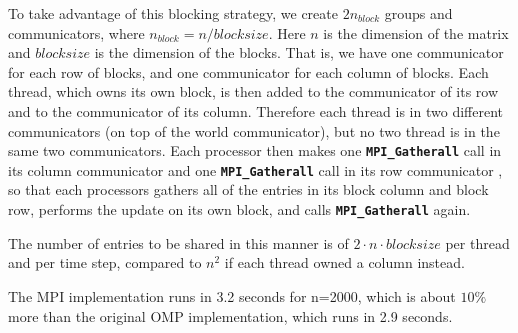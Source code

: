 \documentclass[11pt]{article}
\begin{document}
To take advantage of this blocking strategy, we create  $2n_{block}$ groups and communicators, where $n_{block}=n/blocksize$. Here $n$  is the dimension of the matrix and $blocksize$ is the dimension of the blocks. That is, we have one communicator for each row of blocks, and one communicator for each column of blocks. Each thread, which owns its own block, is then added to the communicator of its row and to the communicator of its column. Therefore each thread is in two different communicators (on top of the world communicator), but no two thread is in the same two communicators. Each processor then makes one \textbf{ \texttt{MPI\_Gatherall} } call in its column communicator and one \textbf{ \texttt{MPI\_Gatherall} } call in its row communicator , so that each processors gathers all of the entries in its block column and block row, performs the update on its own block, and calls \textbf{\texttt{MPI\_Gatherall} }again.

The number of entries to be shared in this manner is of
$2 \cdot n \cdot blocksize$ per thread and per time step, compared to $n^2$ if each thread owned a column instead.

The MPI implementation runs in 3.2 seconds for n=2000, which is about $10 \%$ more than the original OMP implementation, which runs in 2.9 seconds.

\begin{thebibliography}{9}


\end{thebibliography}

 
 
\end{document}
